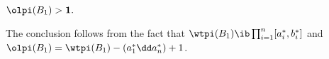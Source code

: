 	
	$\olpi(B_1)>\bf1.$
	
	\eleml
	\bpf
	The conclusion follows from the fact that 
	$\wtpi(B_1)\ib \prod_{i=1}^n [a^{*}_i,b^{*}_i]$ and 
	$\olpi(B_1)=\wtpi(B_1)-(a^{*}_1\dd a^{*}_n)+1$.
	
	\epf
	

